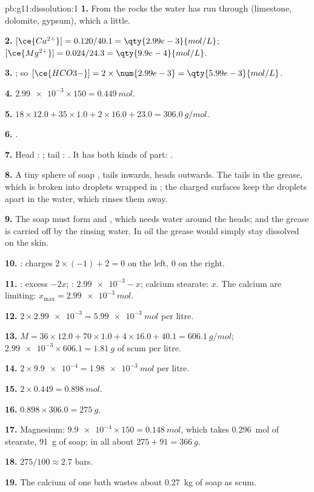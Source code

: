 \begin{solution}{pb:g11:dissolution:1}
\textbf{1.} From the rocks the water has run through (limestone,
dolomite, gypsum), which  a little.

\textbf{2.} $[\ce{Ca^{2+}}] = 0.120 / 40.1 = \qty{2.99e-3}{mol/L}$;
$[\ce{Mg^{2+}}] = 0.024 / 24.3 = \qty{9.9e-4}{mol/L}$.

\textbf{3.} ; so
$[\ce{HCO3-}] = 2 \times \num{2.99e-3} = \qty{5.99e-3}{mol/L}$.

\textbf{4.} $\num{2.99e-3} \times 150 = \qty{0.449}{mol}$.

\textbf{5.} $18 \times 12.0 + 35 \times 1.0 + 2 \times 16.0 + 23.0 =
\qty{306.0}{g/mol}$.

\textbf{6.} .

\textbf{7.} Head : ; tail :
. It has both kinds of part: .

\textbf{8.} A tiny sphere of soap , tails inwards, heads outwards.
The tails  in the grease, which is broken into droplets wrapped
in ; the charged surfaces keep the droplets apart in the water,
which rinses them away.

\textbf{9.} The soap must form  and , which needs water
around the heads; and the grease is carried off by the rinsing water. In
oil the grease would simply stay dissolved on the skin.

\textbf{10.} : charges
$2 \times (-1) + 2 = 0$ on the left, $0$ on the right.

\textbf{11.} : excess $- 2x$; :
$\num{2.99e-3} - x$; calcium stearate: $x$. The calcium  are
limiting: $x_{\max} = \qty{2.99e-3}{mol}$.

\textbf{12.} $2 \times \num{2.99e-3} = \qty{5.99e-3}{mol}$ per litre.

\textbf{13.} $M = 36 \times 12.0 + 70 \times 1.0 + 4 \times 16.0 + 40.1 =
\qty{606.1}{g/mol}$; $\num{2.99e-3} \times 606.1 = \qty{1.81}{g}$ of scum
per litre.

\textbf{14.} $2 \times \num{9.9e-4} = \qty{1.98e-3}{mol}$ per litre.

\textbf{15.} $2 \times 0.449 = \qty{0.898}{mol}$.

\textbf{16.} $0.898 \times 306.0 = \qty{275}{g}$.

\textbf{17.} Magnesium: $\num{9.9e-4} \times 150 = \qty{0.148}{mol}$,
which takes \qty{0.296}{mol} of stearate, \qty{91}{g} of soap; in all
about $275 + 91 = \qty{366}{g}$.

\textbf{18.} $275 / 100 \approx 2.7$ bars.

\textbf{19.} The calcium of one bath wastes about \qty{0.27}{kg} of soap
as scum.
\end{solution}
